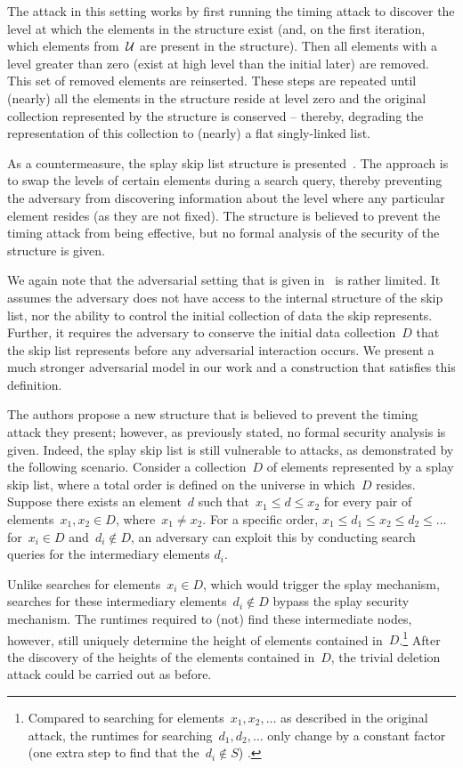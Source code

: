 The attack in this setting works by first running the timing attack to discover the level at which the elements in the structure exist (and, on the first iteration, which elements from~$\mathcal{U}$ are present in the structure). Then all elements with a level greater than zero (exist at high level than the initial later) are removed. This set of removed elements are reinserted. These steps are repeated until (nearly) all the elements in the structure reside at level zero and the original collection represented by the structure is conserved -- thereby, degrading the representation of this collection to (nearly) a flat singly-linked list. 

As a countermeasure, the splay skip list structure is presented~\cite{nussbaum2019skiplist}.  The approach is to swap the levels of certain elements during a search query, thereby preventing the adversary from discovering information about the level where any particular element resides (as they are not fixed). The structure is believed to prevent the timing attack from being effective, but no formal analysis of the security of the structure is given. 

We again note that the adversarial setting that is given in~\cite{nussbaum2019skiplist} is rather limited. It assumes the adversary does not have access to the internal structure of the skip list, nor the ability to control the initial collection of data the skip represents. Further, it requires the adversary to conserve the initial data collection~$D$ that the skip list represents before any adversarial interaction occurs. We present a much stronger adversarial model in our work and a construction that satisfies this definition.

The authors propose a new structure that is believed to prevent the timing attack they present; however, as previously stated, no formal security analysis is given. 
Indeed, the splay skip list is still vulnerable to attacks, as demonstrated by the following scenario. Consider a collection~$D$ of elements represented by a splay skip list, where a total order is defined on the universe in which~$D$ resides. Suppose there exists an element~\( d \) such that~\( x_1 \leq d \leq x_2 \) for every pair of elements~\( x_1, x_2 \in D \), where~$x_1 \neq x_2$. For a specific order, $x_1 \leq d_1 \leq x_2 \leq d_2 \leq \ldots$ for~$x_i \in D$ and~$d_i \notin D$, an adversary can exploit this by conducting search queries for the intermediary elements $d_i$. 

Unlike searches for elements~$x_i \in D$, which would trigger the splay mechanism, searches for these intermediary elements~$d_i \not\in D$ bypass the splay security mechanism. The runtimes required to (not) find these intermediate nodes, however, still uniquely determine the height of elements contained in~$D$.\footnote{Compared to searching for elements~$x_1,x_2,\ldots$ as described in the original attack, the runtimes for searching~$d_1,d_2,\ldots$ only change by a constant factor (one extra step to find that the~$d_i \not\in S$) .} After the discovery of the heights of the elements contained in~$D$, the trivial deletion attack could be carried out as before.
